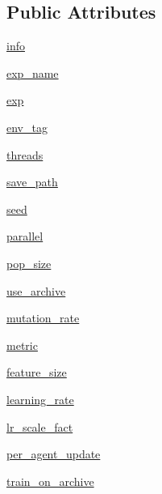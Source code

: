 \subsection*{Public Attributes}
\begin{DoxyCompactItemize}
\item 
\hyperlink{classparameters_1_1_params_a1df59b38fc124d1fbead2f5578c0838c}{info}
\item 
\hyperlink{classparameters_1_1_params_a4a531f6e01960bdccb83b120339b95d7}{exp\+\_\+name}
\item 
\hyperlink{classparameters_1_1_params_ae4ada148b218d2388df8a39bba5fe0b7}{exp}
\item 
\hyperlink{classparameters_1_1_params_af617846272015a7bc270d427001a075b}{env\+\_\+tag}
\item 
\hyperlink{classparameters_1_1_params_afceba00cabd393624772ae58ddc1f0bc}{threads}
\item 
\hyperlink{classparameters_1_1_params_a97a06ed9c9641000ce5776aa01928b75}{save\+\_\+path}
\item 
\hyperlink{classparameters_1_1_params_a1e2b16af5af811b04369c832f2f6b5a8}{seed}
\item 
\hyperlink{classparameters_1_1_params_a2e02ceda8ad2c676f86dfa40e5113e8c}{parallel}
\item 
\hyperlink{classparameters_1_1_params_ab8a068d9959528d73c1356c220740281}{pop\+\_\+size}
\item 
\hyperlink{classparameters_1_1_params_a72f3fe550cb607c5f6251b6f275e6e08}{use\+\_\+archive}
\item 
\hyperlink{classparameters_1_1_params_a6a7d9b2c9b62e96a611c22e9f43de26d}{mutation\+\_\+rate}
\item 
\hyperlink{classparameters_1_1_params_a88386a4d2b625dc76efbbb03153aa0da}{metric}
\item 
\hyperlink{classparameters_1_1_params_a9a9a29fb7ed1cd39878673e024e44fce}{feature\+\_\+size}
\item 
\hyperlink{classparameters_1_1_params_a0d280f417e3714e2d2a9d05461e38441}{learning\+\_\+rate}
\item 
\hyperlink{classparameters_1_1_params_ab52d8c07b3e6fec7415f7003328001a1}{lr\+\_\+scale\+\_\+fact}
\item 
\hyperlink{classparameters_1_1_params_a2c62a5053c39ca8bfaa79fcdb089139b}{per\+\_\+agent\+\_\+update}
\item 
\hyperlink{classparameters_1_1_params_ab45448a64d41b5273a5dbece6b3a105f}{train\+\_\+on\+\_\+archive}
\item 

\end{DoxyCompactItemize}
